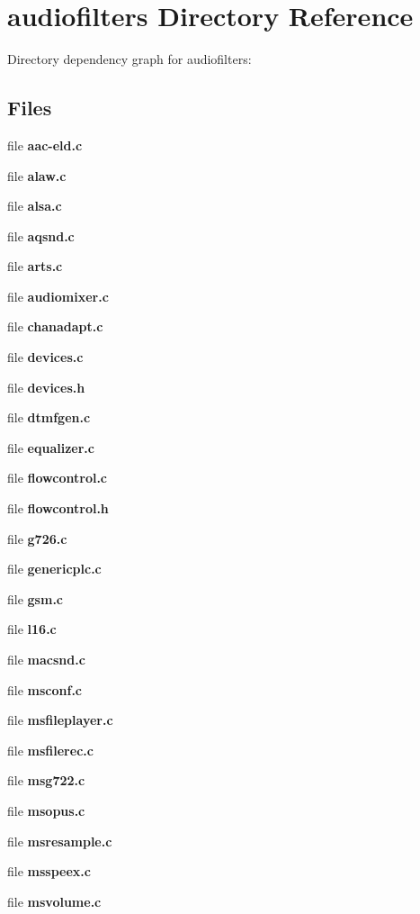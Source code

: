 \section{audiofilters Directory Reference}
\label{dir_8cf1aeb275fd7cf6921448635e850caf}
Directory dependency graph for audiofilters\-:
\subsection*{Files}
\begin{DoxyCompactItemize}
\item 
file {\bfseries aac-\/eld.\-c}
\item 
file {\bfseries alaw.\-c}
\item 
file {\bfseries alsa.\-c}
\item 
file {\bfseries aqsnd.\-c}
\item 
file {\bfseries arts.\-c}
\item 
file {\bfseries audiomixer.\-c}
\item 
file {\bfseries chanadapt.\-c}
\item 
file {\bfseries devices.\-c}
\item 
file {\bfseries devices.\-h}
\item 
file {\bfseries dtmfgen.\-c}
\item 
file {\bfseries equalizer.\-c}
\item 
file {\bfseries flowcontrol.\-c}
\item 
file {\bfseries flowcontrol.\-h}
\item 
file {\bfseries g726.\-c}
\item 
file {\bfseries genericplc.\-c}
\item 
file {\bfseries gsm.\-c}
\item 
file {\bfseries l16.\-c}
\item 
file {\bfseries macsnd.\-c}
\item 
file {\bfseries msconf.\-c}
\item 
file {\bfseries msfileplayer.\-c}
\item 
file {\bfseries msfilerec.\-c}
\item 
file {\bfseries msg722.\-c}
\item 
file {\bfseries msopus.\-c}
\item 
file {\bfseries msresample.\-c}
\item 
file {\bfseries msspeex.\-c}
\item 
file {\bfseries msvolume.\-c}
\item 

\end{DoxyCompactItemize}
